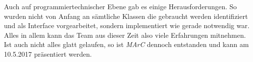 Auch auf programmiertechnischer Ebene gab es einige Herausforderungen. So wurden nicht von Anfang an sämtliche Klassen die gebraucht werden identifiziert und als Interface vorgearbeitet, sondern implementiert wie gerade notwendig war. \\
Alles in allem kann das Team aus dieser Zeit also viele Erfahrungen mitnehmen. Ist auch nicht alles glatt gelaufen, so ist \textit{MArC} dennoch entstanden und kann am 10.5.2017 präsentiert werden.


























